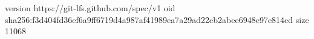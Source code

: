 version https://git-lfs.github.com/spec/v1
oid sha256:f3d404fd36ef6a9ff6719d4a987af41989ea7a29ad22eb2abee6948e97e814cd
size 11068
